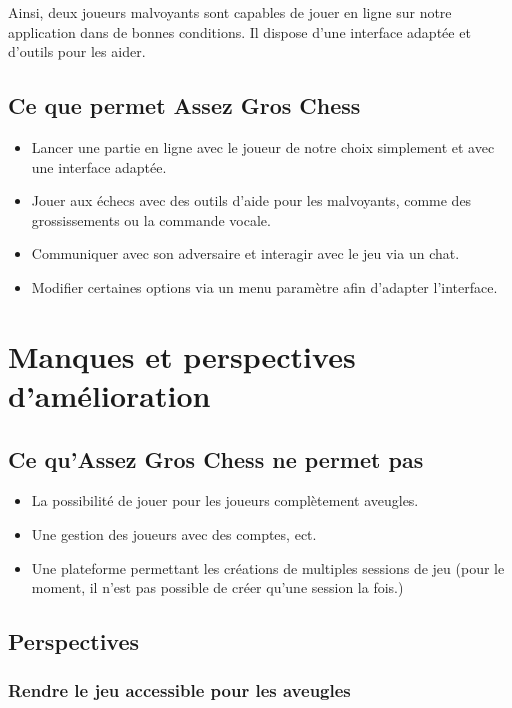 \documentclass[12pt, openany]{report}
\begin{document}
Ainsi, deux joueurs malvoyants sont capables de jouer en ligne sur notre application dans de bonnes conditions. Il dispose d'une interface adaptée et d'outils pour les aider. 

\subsection{Ce que permet Assez Gros Chess}

\begin{itemize}
    \item Lancer une partie en ligne avec le joueur de notre choix simplement et avec une interface adaptée.
    \item Jouer aux échecs avec des outils d'aide pour les malvoyants, comme des grossissements ou la commande vocale.
    \item Communiquer avec son adversaire et interagir avec le jeu via un chat.
    \item Modifier certaines options via un menu paramètre afin d'adapter l'interface.
    
\end{itemize}

\section{Manques et perspectives d'amélioration}
\subsection{Ce qu'Assez Gros Chess ne permet pas}

\begin{itemize}
    \item La possibilité de jouer pour les joueurs complètement aveugles.
    \item Une gestion des joueurs avec des comptes, ect.
    \item Une plateforme permettant les créations de multiples sessions de jeu (pour le moment, il n'est pas possible de créer qu'une session la fois.)
\end{itemize}
\subsection{Perspectives}

\subsubsection{Rendre le jeu accessible pour les aveugles}
\end{document}
